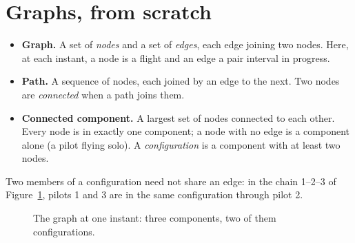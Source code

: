 \section{Graphs, from scratch}\label{app:graphs}

\begin{itemize}
  \item \textbf{Graph.} A set of \emph{nodes} and a set of \emph{edges}, each edge joining two
        nodes. Here, at each instant, a node is a flight and an edge a pair interval in progress.
  \item \textbf{Path.} A sequence of nodes, each joined by an edge to the next. Two nodes are
        \emph{connected} when a path joins them.
  \item \textbf{Connected component.} A largest set of nodes connected to each other. Every node is
        in exactly one component; a node with no edge is a component alone (a pilot flying solo).
        A \emph{configuration} is a component with at least two nodes.
\end{itemize}

Two members of a configuration need not share an edge: in the chain 1--2--3 of
Figure~\ref{fig:graph}, pilots 1 and 3 are in the same configuration through pilot 2.

\begin{figure}[H]
\centering
{}
\caption{The graph at one instant: three components, two of them configurations.}
\label{fig:graph}
\end{figure}

